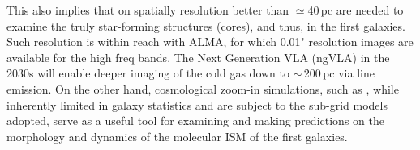 \IfFileExists{emulateapjlegacy.cls}{\documentclass[iop]{emulateapjlegacy}}{\documentclass[iop]{emulateapj}}
\begin{document}
This also implies that \obs on spatially resolution better than $\simeq$40\,pc are needed to examine the truly star-forming structures (cores), and thus, \SF in the first galaxies.
%
Such resolution is within reach with ALMA, for which 0.01" resolution images are available for the high freq bands. The Next Generation VLA (ngVLA) in the 2030s will enable deeper imaging of the cold gas down to $\sim$\,200\,pc via \aco line emission. %
On the other hand, cosmological zoom-in simulations, such as , while inherently limited in galaxy statistics and are subject to the sub-grid models adopted, serve as a useful tool for examining and making predictions on the morphology and dynamics of the molecular ISM of the first galaxies.


\end{document}
